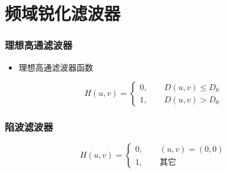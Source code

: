 \documentclass{beamer}
\begin{document}
\section{频域锐化滤波器}
\label{sec-8}
\begin{frame}
\frametitle{理想高通滤波器}
\label{sec-8-1}

\begin{itemize}
\item 理想高通滤波器函数
\end{itemize}
\[ H(u,v) = \begin{cases} 0, \qquad D(u,v)\leq D_0 \\    1, \qquad D(u,v) > D_0 \end{cases} \]
\end{frame}
\begin{frame}
\frametitle{陷波滤波器}
\label{sec-8-2}

\[ H(u,v) = \begin{cases} 0, \qquad (u,v)=(0,0) \\    1, \qquad \text{其它} \end{cases} \]
\end{frame}
\end{document}
